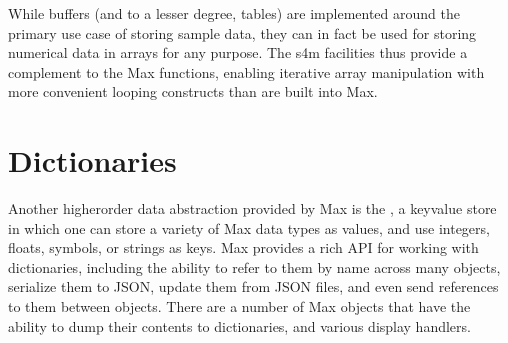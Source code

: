 \documentclass[letterpaper,10pt,english]{sphinxmanual}
\begin{document}
\begin{sphinxVerbatim}[commandchars=\\\{\}]





\end{sphinxVerbatim}

\sphinxAtStartPar
While buffers (and to a lesser degree, tables) are implemented around the primary use case
of storing sample data, they can in fact be used for storing numerical
data in arrays for any purpose. The s4m facilities thus provide a complement to the
Max functions, enabling iterative array manipulation with more convenient
looping constructs than are built into Max.


\section{Dictionaries}
\label{\detokenize{features_usage:dictionaries}}
\sphinxAtStartPar
Another higher\sphinxhyphen{}order data abstraction provided by Max is the
, a key\sphinxhyphen{}value store in which one can store a variety
of Max data types as values, and use integers, floats, symbols, or strings
as keys. Max provides a rich API for working with dictionaries, including
the ability to refer to them by name across many objects, serialize them
to JSON, update them from JSON files, and even send references to them
between objects. There are a number of Max objects that have the ability
to dump their contents to dictionaries, and various display handlers.
\end{document}
